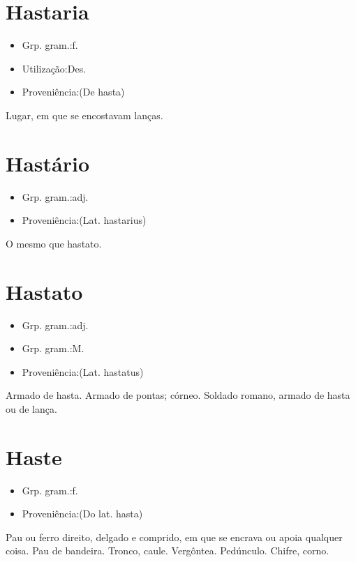\documentclass{article}
\begin{document}
\section{Hastaria}
\begin{itemize}
\item {Grp. gram.:f.}
\end{itemize}
\begin{itemize}
\item {Utilização:Des.}
\end{itemize}
\begin{itemize}
\item {Proveniência:(De \textunderscore hasta\textunderscore )}
\end{itemize}
Lugar, em que se encostavam lanças.
\section{Hastário}
\begin{itemize}
\item {Grp. gram.:adj.}
\end{itemize}
\begin{itemize}
\item {Proveniência:(Lat. \textunderscore hastarius\textunderscore )}
\end{itemize}
O mesmo que \textunderscore hastato\textunderscore .
\section{Hastato}
\begin{itemize}
\item {Grp. gram.:adj.}
\end{itemize}
\begin{itemize}
\item {Grp. gram.:M.}
\end{itemize}
\begin{itemize}
\item {Proveniência:(Lat. \textunderscore hastatus\textunderscore )}
\end{itemize}
Armado de hasta.
Armado de pontas; córneo.
Soldado romano, armado de hasta ou de lança.
\section{Haste}
\begin{itemize}
\item {Grp. gram.:f.}
\end{itemize}
\begin{itemize}
\item {Proveniência:(Do lat. \textunderscore hasta\textunderscore )}
\end{itemize}
Pau ou ferro direito, delgado e comprido, em que se encrava ou apoia qualquer coisa.
Pau de bandeira.
Tronco, caule.
Vergôntea.
Pedúnculo.
Chifre, corno.
\end{document}
